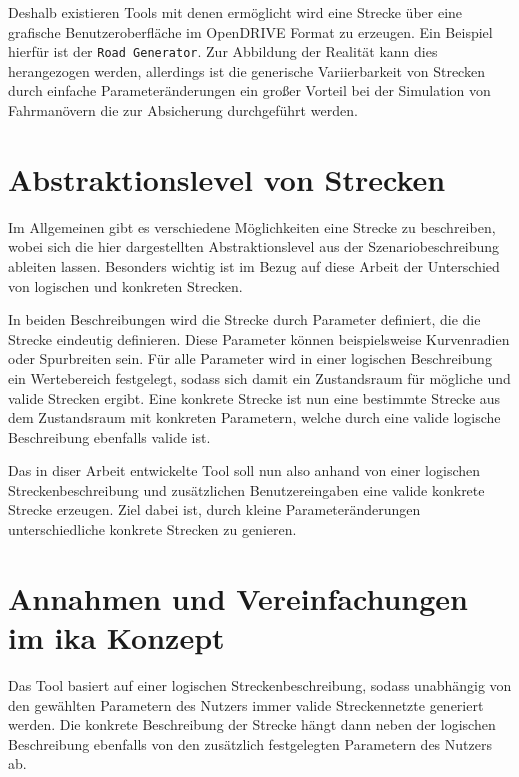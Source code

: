Deshalb existieren Tools mit denen ermöglicht wird eine Strecke über eine grafische Benutzeroberfläche im OpenDRIVE Format zu erzeugen. Ein Beispiel hierfür ist der \texttt{Road Generator}.\cite{RoadGenerator.2019} Zur Abbildung der Realität kann dies herangezogen werden, allerdings ist die generische Variierbarkeit von Strecken durch einfache Parameteränderungen ein großer Vorteil bei der Simulation von Fahrmanövern die zur Absicherung durchgeführt werden. 

\chapter{Abstraktionslevel von Strecken}

Im Allgemeinen gibt es verschiedene Möglichkeiten eine Strecke zu beschreiben, wobei sich die hier dargestellten Abstraktionslevel aus der Szenariobeschreibung ableiten lassen. Besonders wichtig ist im Bezug auf diese Arbeit der Unterschied von logischen und konkreten Strecken.

In beiden Beschreibungen wird die Strecke durch Parameter definiert, die die Strecke eindeutig definieren. Diese Parameter können beispielsweise Kurvenradien oder Spurbreiten sein. Für alle Parameter wird in einer logischen Beschreibung ein Wertebereich festgelegt, sodass sich damit ein Zustandsraum für mögliche und valide Strecken ergibt. Eine konkrete Strecke ist nun eine bestimmte Strecke aus dem Zustandsraum mit konkreten Parametern, welche durch eine valide logische Beschreibung ebenfalls valide ist.\cite{Szenarienbeschreibung.2019}

Das in diser Arbeit entwickelte Tool soll nun also anhand von einer logischen Streckenbeschreibung und zusätzlichen Benutzereingaben eine valide konkrete Strecke erzeugen. Ziel dabei ist, durch kleine Parameteränderungen unterschiedliche konkrete Strecken zu genieren.  

\chapter {Annahmen und Vereinfachungen im ika Konzept}

Das Tool basiert auf einer logischen Streckenbeschreibung, sodass unabhängig von den gewählten Parametern des Nutzers immer valide Streckennetzte generiert werden. Die konkrete Beschreibung der Strecke hängt dann neben der logischen Beschreibung ebenfalls von den zusätzlich festgelegten Parametern des Nutzers ab. 

